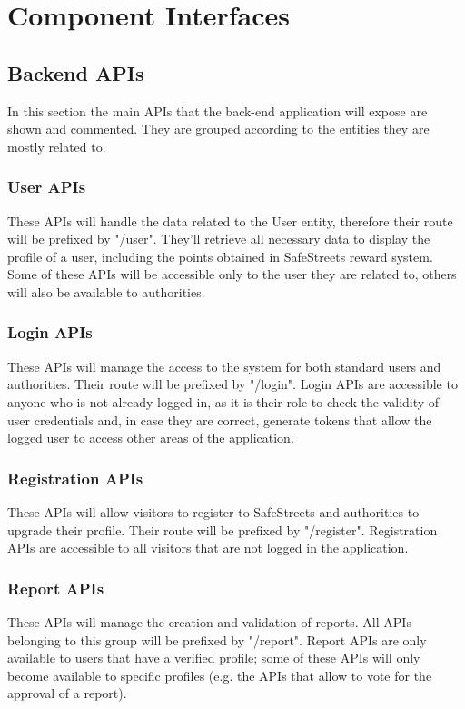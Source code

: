 \section{Component Interfaces}

\subsection{Backend APIs}
In this section the main APIs that the back-end application will expose are shown and commented. They are grouped according to the entities they are mostly related to.

\subsubsection{User APIs}
These APIs will handle the data related to the User entity, therefore their route will be prefixed by "/user". They'll retrieve all necessary data to display the profile of a user, including the points obtained in SafeStreets reward system. Some of these APIs will be accessible only to the user they are related to, others will also be available to authorities.

\subsubsection{Login APIs}
These APIs will manage the access to the system for both standard users and authorities. Their route will be prefixed by "/login". Login APIs are accessible to anyone who is not already logged in, as it is their role to check the validity of user credentials and, in case they are correct, generate tokens that allow the logged user to access other areas of the application.

\subsubsection{Registration APIs}
These APIs will allow visitors to register to SafeStreets and authorities to upgrade their profile. Their route will be prefixed by "/register". Registration APIs are accessible to all visitors that are not logged in the application.

\subsubsection{Report APIs}
These APIs will manage the creation and validation of reports. All APIs belonging to this group will be prefixed by "/report". Report APIs are only available to users that have a verified profile; some of these APIs will only become available to specific profiles (e.g. the APIs that allow to vote for the approval of a report).

